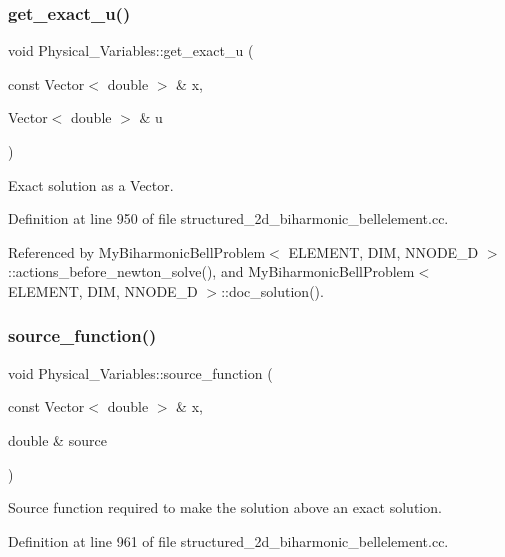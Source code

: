\subsubsection{\texorpdfstring{get\+\_\+exact\+\_\+u()}{get\_exact\_u()}}
{\footnotesize\ttfamily void Physical\+\_\+\+Variables\+::get\+\_\+exact\+\_\+u (\begin{DoxyParamCaption}\item[{const Vector$<$ double $>$ \&}]{x,  }\item[{Vector$<$ double $>$ \&}]{u }\end{DoxyParamCaption})}



Exact solution as a Vector. 



Definition at line 950 of file structured\+\_\+2d\+\_\+biharmonic\+\_\+bellelement.\+cc.



Referenced by My\+Biharmonic\+Bell\+Problem$<$ E\+L\+E\+M\+E\+N\+T, D\+I\+M, N\+N\+O\+D\+E\+\_\+D $>$\+::actions\+\_\+before\+\_\+newton\+\_\+solve(), and My\+Biharmonic\+Bell\+Problem$<$ E\+L\+E\+M\+E\+N\+T, D\+I\+M, N\+N\+O\+D\+E\+\_\+D $>$\+::doc\+\_\+solution().

\mbox{\label{namespacePhysical__Variables_ae11027d76c5f512b7db6a1b6d17dc792}} 
\subsubsection{\texorpdfstring{source\+\_\+function()}{source\_function()}}
{\footnotesize\ttfamily void Physical\+\_\+\+Variables\+::source\+\_\+function (\begin{DoxyParamCaption}\item[{const Vector$<$ double $>$ \&}]{x,  }\item[{double \&}]{source }\end{DoxyParamCaption})}



Source function required to make the solution above an exact solution. 



Definition at line 961 of file structured\+\_\+2d\+\_\+biharmonic\+\_\+bellelement.\+cc.



